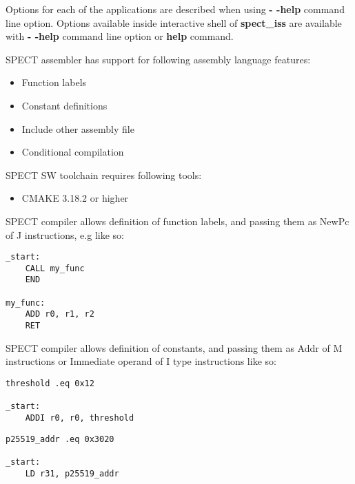 \documentclass{tropic_design_spec}
\begin{document}
Options for each of the applications are described when using \textbf{- -help}
command line option. Options available inside interactive shell of
\textbf{spect_iss} are available with \textbf{- -help} command line option or \textbf{help}
command.

SPECT assembler has support for following assembly language features:
\begin{itemize}
    \item{Function labels}
    \item{Constant definitions}
    \item{Include other assembly file}
    \item{Conditional compilation}
\end{itemize}


SPECT SW toolchain requires following tools:
\begin{itemize}
    \item CMAKE 3.18.2 or higher
\end{itemize}


SPECT compiler allows definition of function labels, and passing them
as NewPc of J instructions, e.g like so:

\begin{lstlisting}
_start:
    CALL my_func
    END

my_func:
    ADD r0, r1, r2
    RET
\end{lstlisting}


SPECT compiler allows definition of constants, and passing them as
Addr of M instructions or Immediate operand of I type instructions like so:

\begin{lstlisting}
threshold .eq 0x12

_start:
    ADDI r0, r0, threshold
\end{lstlisting}

\begin{lstlisting}
p25519_addr .eq 0x3020

_start:
    LD r31, p25519_addr
\end{lstlisting}

\end{document}
